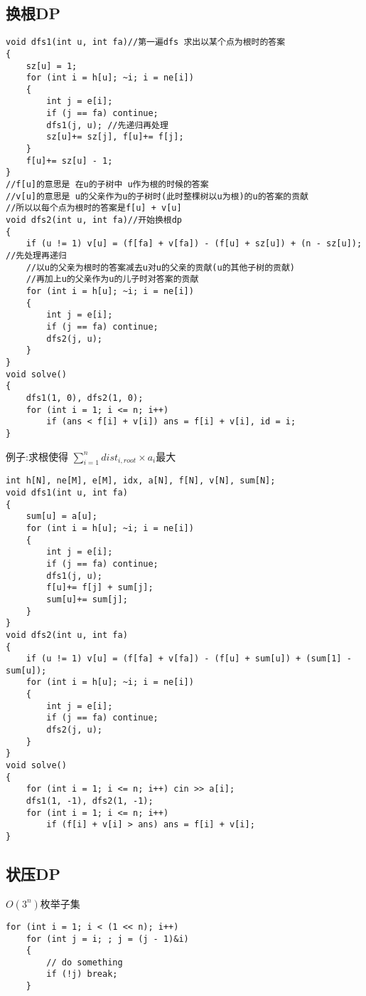 \documentclass[a4paper,fontset=none]{ctexart}
\begin{document}
\subsection{换根DP}

\begin{verbatim}
void dfs1(int u, int fa)//第一遍dfs 求出以某个点为根时的答案
{
    sz[u] = 1;
    for (int i = h[u]; ~i; i = ne[i])
    {
        int j = e[i];
        if (j == fa) continue;
        dfs1(j, u); //先递归再处理
        sz[u]+= sz[j], f[u]+= f[j];
    }
    f[u]+= sz[u] - 1;
}
//f[u]的意思是 在u的子树中 u作为根的时候的答案
//v[u]的意思是 u的父亲作为u的子树时(此时整棵树以u为根)的u的答案的贡献
//所以以每个点为根时的答案是f[u] + v[u]
void dfs2(int u, int fa)//开始换根dp
{
    if (u != 1) v[u] = (f[fa] + v[fa]) - (f[u] + sz[u]) + (n - sz[u]); //先处理再递归
    //以u的父亲为根时的答案减去u对u的父亲的贡献(u的其他子树的贡献)
    //再加上u的父亲作为u的儿子时对答案的贡献
    for (int i = h[u]; ~i; i = ne[i])
    {
        int j = e[i];
        if (j == fa) continue;
        dfs2(j, u);
    }
}
void solve()
{
    dfs1(1, 0), dfs2(1, 0);
    for (int i = 1; i <= n; i++)
        if (ans < f[i] + v[i]) ans = f[i] + v[i], id = i;
}
\end{verbatim}

例子:求根使得 $\sum\limits_{i=1}^n{dist_{i,root}\times a_i}$最大

\begin{verbatim}
int h[N], ne[M], e[M], idx, a[N], f[N], v[N], sum[N];
void dfs1(int u, int fa)
{
    sum[u] = a[u];
    for (int i = h[u]; ~i; i = ne[i])
    {
        int j = e[i];
        if (j == fa) continue;
        dfs1(j, u);
        f[u]+= f[j] + sum[j];
        sum[u]+= sum[j];
    }
}
void dfs2(int u, int fa)
{
    if (u != 1) v[u] = (f[fa] + v[fa]) - (f[u] + sum[u]) + (sum[1] - sum[u]);
    for (int i = h[u]; ~i; i = ne[i])
    {
        int j = e[i];
        if (j == fa) continue;
        dfs2(j, u);
    }
}
void solve()
{
    for (int i = 1; i <= n; i++) cin >> a[i];
    dfs1(1, -1), dfs2(1, -1);
    for (int i = 1; i <= n; i++)
        if (f[i] + v[i] > ans) ans = f[i] + v[i];
}
\end{verbatim}
\subsection{状压DP}

$O(3^n)$枚举子集

\begin{verbatim}
for (int i = 1; i < (1 << n); i++)
    for (int j = i; ; j = (j - 1)&i)
    {
        // do something
        if (!j) break;
    }
\end{verbatim}
\end{document}
